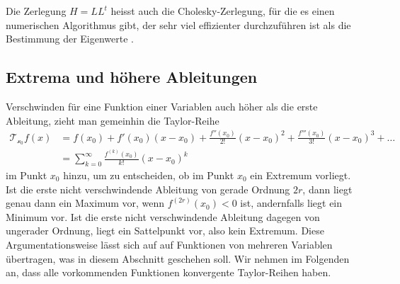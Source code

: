 Die Zerlegung $H=LL^t$ heisst auch die Cholesky-Zerlegung, für die
\label{Cholesky-Zerlegung}%
es einen numerischen Algorithmus gibt, der sehr viel effizienter
durchzuführen ist als die Bestimmung der Eigenwerte
\cite[Abschnitt 12.3]{buch:linalg}.


%
%
\subsection{Extrema und höhere Ableitungen
\label{buch:fuvar:hessesche:subsection:extrema}}
Verschwinden für eine Funktion einer Variablen auch höher als die erste
Ableitung, zieht man gemeinhin die Taylor-Reihe
\begin{align*}
\mathscr{T_{x_0}}f(x)
&=
f(x_0) + f'(x_0)(x-x_0)
+
\frac{f''(x_0)}{2!}(x-x_0)^2
+
\frac{f'''(x_0)}{3!}(x-x_0)^3
+
\dots
\\
&=
\sum_{k=0}^\infty \frac{f^{(k)}(x_0)}{k!}(x-x_0)^k
\end{align*}
im Punkt $x_0$ hinzu, um zu entscheiden, ob im Punkt $x_0$ ein Extremum
vorliegt.
Ist die erste nicht verschwindende Ableitung von gerade Ordnung $2r$, dann
liegt genau dann ein Maximum vor, wenn $f^{(2r)}(x_0)<0$ ist, andernfalls
liegt ein Minimum vor.
Ist die erste nicht verschwindende Ableitung dagegen von ungerader Ordnung,
liegt ein Sattelpunkt vor, also kein Extremum.
Diese Argumentationsweise lässt sich auf auf Funktionen von mehreren
Variablen übertragen, was in diesem Abschnitt geschehen soll.
Wir nehmen im Folgenden an, dass alle vorkommenden Funktionen konvergente
Taylor-Reihen haben.

%
%
